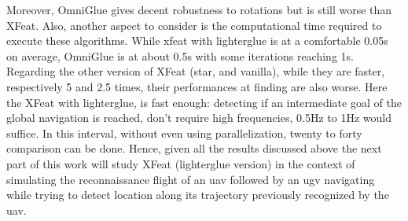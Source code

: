 Moreover, OmniGlue gives decent robustness to rotations but is still worse than XFeat.
Also, another aspect to consider is the computational time required to execute these algorithms.
While xfeat with lighterglue is at a comfortable 0.05s on average, OmniGlue is at about 0.5s with some iterations reaching 1s.
Regarding the other version of XFeat (star, and vanilla), while they are faster, respectively 5 and 2.5 times, their performances
at finding are also worse.
Here the XFeat with lighterglue, is fast enough: detecting if an intermediate goal of the global navigation is reached,
don't require high frequencies, 0.5Hz to 1Hz would suffice.
In this interval, without even using parallelization, twenty to forty comparison can be done.
Hence, given all the results discussed above the next part of this work will study XFeat (lighterglue version) in the context of simulating
the reconnaissance flight of an \gls{uav} followed by an \gls{ugv} navigating while trying to detect location along its trajectory previously
recognized by the \gls{uav}.


